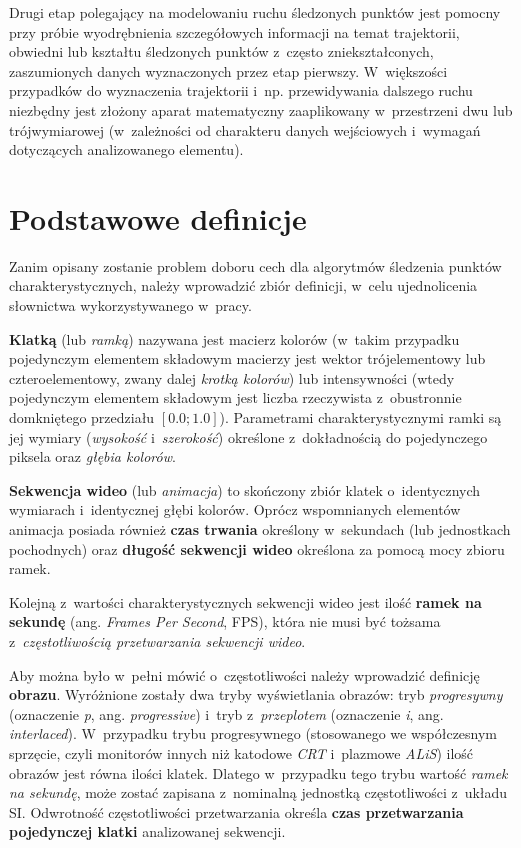     Drugi etap polegający na modelowaniu ruchu śledzonych punktów jest pomocny przy próbie wyodrębnienia szczegółowych informacji na temat trajektorii, obwiedni lub kształtu śledzonych punktów z~często zniekształconych, zaszumionych danych wyznaczonych przez etap pierwszy. W~większości przypadków do wyznaczenia trajektorii i~np. przewidywania dalszego ruchu niezbędny jest złożony aparat matematyczny zaaplikowany w~przestrzeni dwu lub trójwymiarowej (w~zależności od charakteru danych wejściowych i~wymagań dotyczących analizowanego elementu).

  \section{Podstawowe definicje}\label{Section_Definicje}
    Zanim opisany zostanie problem doboru cech dla algorytmów śledzenia punktów charakterystycznych, należy wprowadzić zbiór definicji, w~celu ujednolicenia słownictwa wykorzystywanego w~pracy.

    \textbf{Klatką} (lub \textit{ramką}) nazywana jest macierz kolorów (w~takim przypadku pojedynczym elementem składowym macierzy jest wektor trójelementowy lub czteroelementowy, zwany dalej \textit{krotką kolorów}) lub intensywności (wtedy pojedynczym elementem składowym jest liczba rzeczywista z~obustronnie domkniętego przedziału $[0.0; 1.0]$). Parametrami charakterystycznymi ramki są jej wymiary (\textit{wysokość} i~\textit{szerokość}) określone z~dokładnością do pojedynczego piksela oraz \textit{głębia kolorów}.

    \textbf{Sekwencja wideo} (lub \textit{animacja}) to skończony zbiór klatek o~identycznych wymiarach i~identycznej głębi kolorów. Oprócz wspomnianych elementów animacja posiada również \textbf{czas trwania} określony w~sekundach (lub jednostkach pochodnych) oraz \textbf{długość sekwencji wideo} określona za pomocą mocy zbioru ramek.

    Kolejną z~wartości charakterystycznych sekwencji wideo jest ilość \textbf{ramek na sekundę} (ang. \textit{Frames Per Second}, FPS), która nie musi być tożsama z~\textit{częstotliwością przetwarzania sekwencji wideo}.

    Aby można było w~pełni mówić o~częstotliwości należy wprowadzić definicję \textbf{obrazu}. Wyróżnione zostały dwa tryby wyświetlania obrazów: tryb \textit{progresywny} (oznaczenie \textit{p}, ang. \textit{progressive}) i~tryb z~\textit{przeplotem} (oznaczenie \textit{i}, ang. \textit{interlaced}). W~przypadku trybu progresywnego (stosowanego we współczesnym sprzęcie, czyli monitorów innych niż katodowe \textit{CRT} i~plazmowe \textit{ALiS}) ilość obrazów jest równa ilości klatek. Dlatego w~przypadku tego trybu wartość \textit{ramek na sekundę}, może zostać zapisana z~nominalną jednostką częstotliwości z~układu SI. Odwrotność częstotliwości przetwarzania określa \textbf{czas przetwarzania pojedynczej klatki} analizowanej sekwencji.

